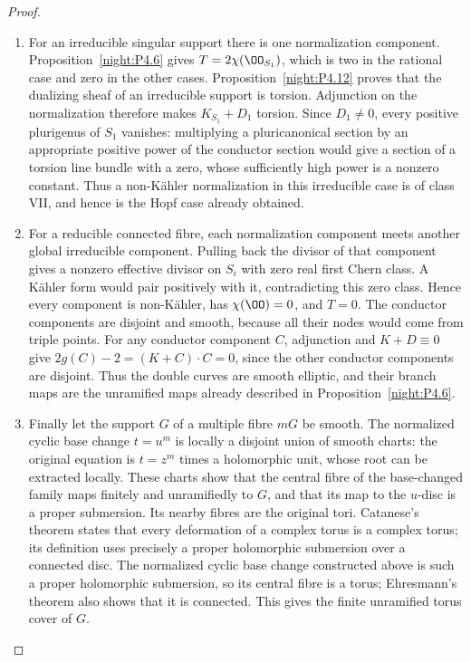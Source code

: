 \begin{proof}
\begin{enumerate}[label={$\langle1\rangle$\arabic*.},leftmargin=*]
\item For an irreducible singular support there is one normalization
component. Proposition~\ref{night:P4.6} gives $T=2\chi(\OO_{S_1})$, which is two in the
rational case and zero in the other cases. Proposition~\ref{night:P4.12} proves that the
dualizing sheaf of an irreducible support is torsion. Adjunction on
the normalization therefore makes $K_{S_1}+D_1$ torsion. Since
$D_1\ne0$, every positive plurigenus of $S_1$ vanishes: multiplying
a pluricanonical section by an appropriate positive power of the
conductor section would give a section of a torsion line bundle with
a zero, whose sufficiently high power is a nonzero constant. Thus a
non-Kähler normalization in this irreducible case is of class VII,
and hence is the Hopf case already obtained.

\item For a reducible connected fibre, each normalization component meets
another global irreducible component. Pulling back the divisor of
that component gives a nonzero effective divisor on $S_i$ with zero
real first Chern class. A Kähler form would pair positively with it,
contradicting this zero class. Hence every component is non-Kähler,
has $\chi(\OO)=0$, and $T=0$. The conductor components are disjoint
and smooth, because all their nodes would come from triple points.
For any conductor component $C$, adjunction and $K+D\equiv0$ give
$2g(C)-2=(K+C)\cdot C=0$, since the other conductor components
are disjoint. Thus the double curves are smooth elliptic, and their
branch maps are the unramified maps already described in Proposition~\ref{night:P4.6}.

\item Finally let the support $G$ of a multiple fibre $mG$ be smooth. The
normalized cyclic base change $t=u^m$ is locally a disjoint union of
smooth charts: the original equation is $t=z^m$ times a holomorphic
unit, whose root can be extracted locally. These charts show that
the central fibre of the base-changed family maps finitely and
unramifiedly to $G$, and that its map to the $u$-disc is a proper submersion. Its nearby
fibres are the original tori. Catanese's theorem
\cite[definition of deformation equivalence, p.~261; Theorem~2.1 and proof, pp.~264--268]{Catanese2004} states that every
deformation of a complex torus is a complex torus; its definition
uses precisely a proper holomorphic submersion over a connected
disc. The normalized cyclic base change constructed above is such
a proper holomorphic submersion, so its central fibre is a torus;
Ehresmann's theorem also shows that it is connected. This gives
the finite unramified torus cover of $G$.

\end{enumerate}
\end{proof}